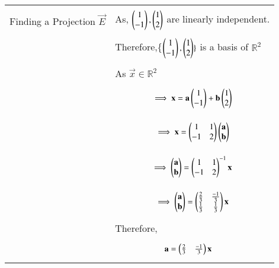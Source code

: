 \documentclass[journal,12pt]{IEEEtran}
\begin{document}
\begin{longtable}{|p{4cm}|p{14cm}|}
\hline
\multirow{3}{*}{Finding a Projection $\vec{E}$} & \\
       & As, $\begin{pmatrix}1\\-1\end{pmatrix},\begin{pmatrix}1\\2\end{pmatrix}$ are linearly independent.\\
       &\\
       & Therefore,\{$\begin{pmatrix}1\\-1\end{pmatrix},\begin{pmatrix}1\\2\end{pmatrix}\}$ is a basis of $\mathbb{R}^{2}$\\
       &\\
       & As $\vec{x} \in \mathbb{R}^{2}$\\
       &{\begin{align}
       \implies \mathbf{x} = \mathbf{a}\begin{pmatrix}1\\-1\end{pmatrix} +\mathbf{b}\begin{pmatrix}1\\2\end{pmatrix}
       \end{align}}\\
       \hline
       &{\begin{align}
       \implies \mathbf{x} = \begin{pmatrix}1&1\\-1&2\end{pmatrix}\begin{pmatrix}\mathbf{a}\\\mathbf{b}\end{pmatrix}
        \end{align}}\\
        &{\begin{align}
        \implies \begin{pmatrix}\mathbf{a}\\\mathbf{b}\end{pmatrix}=\begin{pmatrix}1&1\\-1&2\end{pmatrix}^{-1}\mathbf{x}
        \end{align}}\\
       &
       {\begin{align}
       \implies \begin{pmatrix}\mathbf{a}\\\mathbf{b}\end{pmatrix} = \begin{pmatrix}\frac{2}{3}&\frac{-1}{3}\\\frac{1}{3}&\frac{1}{3}\end{pmatrix}\mathbf{x}
       \end{align}}\\
       & Therefore,\\
       &{\begin{align}\label{eq3}
          \mathbf{a} &=\begin{pmatrix}\frac{2}{3}&\frac{-1}{3}\end{pmatrix}\mathbf{x}
       \end{align}}\\
       

\end{longtable}
\end{document}
